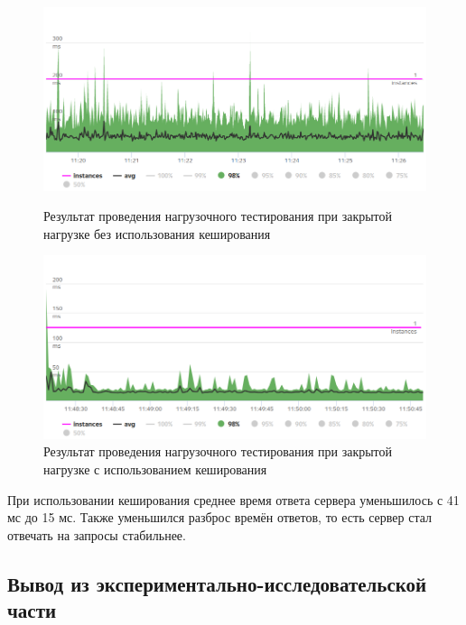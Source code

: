 \begin{figure}[h]
	\centering
	\includegraphics[width=\textwidth ]{img/Load_testing/const_load_instances_nocached.png}
	\caption{Результат проведения нагрузочного тестирования при закрытой нагрузке без использования кеширования}
	\label{fig:const_load_instances_nocached}
	
	\centering
	\includegraphics[width=\textwidth ]{img/Load_testing/const_load_instances_cached.png}
	\caption{Результат проведения нагрузочного тестирования при закрытой нагрузке с использованием кеширования}
	\label{fig:const_load_instances_cached}
\end{figure} 

\clearpage

При использовании кеширования среднее время ответа сервера уменьшилось с 41 мс до 15 мс. Также уменьшился разброс времён ответов, то есть сервер стал отвечать на запросы стабильнее. %



\subsection*{Вывод из экспериментально-исследовательской части}

